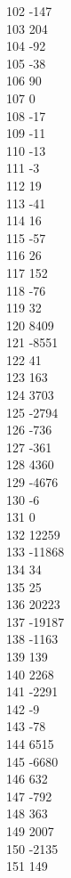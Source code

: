 { 102	-147 \\
 103	204 \\
 104	-92 \\
 105	-38 \\
 106	90 \\
 107	0 \\
 108	-17 \\
 109	-11 \\
 110	-13 \\
 111	-3 \\
 112	19 \\
 113	-41 \\
 114	16 \\
 115	-57 \\
 116	26 \\
 117	152 \\
 118	-76 \\
 119	32 \\
 120	8409 \\
 121	-8551 \\
 122	41 \\
 123	163 \\
 124	3703 \\
 125	-2794 \\
 126	-736 \\
 127	-361 \\
 128	4360 \\
 129	-4676 \\
 130	-6 \\
 131	0 \\
 132	12259 \\
 133	-11868 \\
 134	34 \\
 135	25 \\
 136	20223 \\
 137	-19187 \\
 138	-1163 \\
 139	139 \\
 140	2268 \\
 141	-2291 \\
 142	-9 \\
 143	-78 \\
 144	6515 \\
 145	-6680 \\
 146	632 \\
 147	-792 \\
 148	363 \\
 149	2007 \\
 150	-2135 \\
 151	149 \\
}
